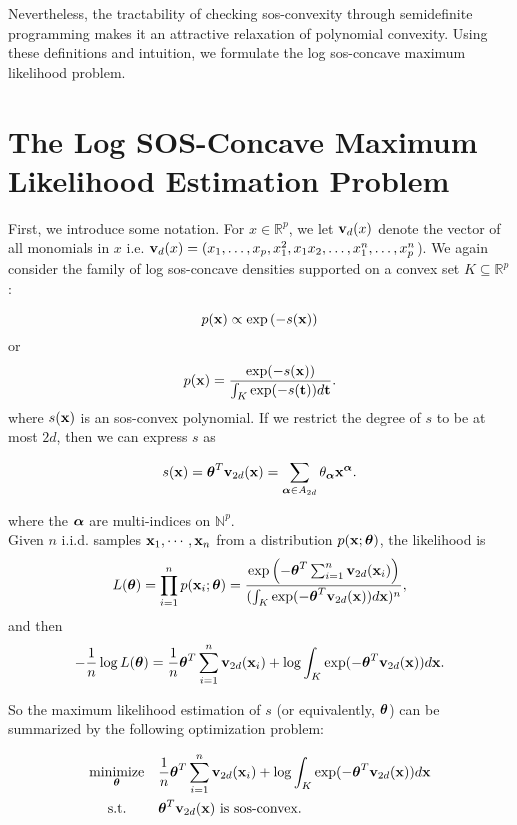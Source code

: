 \documentclass[11pt,reqno]{amsart}
\numberwithin{equation}{section}
\newcommand{\mr}{\mathbb{R}}
\newcommand{\optprob}[5]
{
	\begin{equation}\label{#5}
	\begin{aligned}
	& \underset{#2}{\text{#1}}
	& & #3 \\
	& \text{\quad\ s.t.}
	& & #4
	\end{aligned}
	\end{equation}
}
\begin{document}
Nevertheless, the tractability of checking sos-convexity through semidefinite programming makes it an attractive relaxation of polynomial convexity. Using these definitions and intuition, we formulate the log sos-concave maximum likelihood problem.

\section{The Log SOS-Concave Maximum Likelihood Estimation Problem}

First, we introduce some notation. For $x \in \mr^p$, we let ${\bf v}_d(x)$ denote the vector of all monomials in $x$ i.e. ${\bf v}_d(x) = (x_1, \hdots, x_p, x_1^2, x_1 x_2, \hdots, x_1^n, \hdots, x_p^n$). We again consider the family of log sos-concave densities supported on a convex set $K \subseteq \mathbb R^p$:

\begin{equation} \notag
p({\bf x}) \propto \exp \left(-s({\bf x})\right)
\end{equation}
or
\begin{equation} \notag
p({\bf x}) = \frac{\exp (-s({\bf x}))}{\int_K \exp (-s({\bf t})) d{\bf t}}.
\end{equation}
where $s({\bf x})$ is an sos-convex polynomial. If we restrict the degree of $s$ to be at most $2d$, then we can express $s$ as 

\[
s({\bf x}) = {\boldsymbol\theta}^T{\bf v}_{2d}({\bf x}) = \sum_{{\boldsymbol\alpha} \in A_{2d}} \theta_{\boldsymbol\alpha} {\bf x}^{\boldsymbol\alpha}.
\]

where the ${\boldsymbol\alpha}$ are multi-indices on $\mathbb{N}^p$. \\

Given $n$ i.i.d. samples ${\bf x}_1, \cdots, {\bf x}_n$ from a distribution $p({\bf x}; {\boldsymbol\theta})$, the likelihood is
\begin{equation} \notag
L({\boldsymbol\theta}) = \prod_{i = 1} ^n p({\bf x}_i; {\boldsymbol\theta}) = \frac{\exp \left( -{\boldsymbol\theta}^T \sum_{i = 1}^n {\bf v}_{2d}({\bf x}_i)   \right)}{(\int_K \exp (-{\boldsymbol\theta}^T{\bf v}_{2d}({\bf x})) d{\bf x})^n},
\end{equation}
and then
$$- \frac{1}{n} \log L({\boldsymbol\theta}) = \frac{1}{n} {\boldsymbol\theta}^T \sum_{i = 1}^n {\bf v}_{2d}({\bf x}_i) + \log \int_K \exp (-{\boldsymbol\theta}^T{\bf v}_{2d}({\bf x})) d{\bf x}.$$

So the maximum likelihood estimation of $s$ (or equivalently, ${\boldsymbol\theta}$) can be summarized by the following optimization problem:
\optprob{minimize}{\bftheta}{\frac{1}{n} \bftheta^T \sum_{i = 1}^n \bfv_{2d}(\bfx_i) + \log \int_K \exp (-\bftheta^T\bfv_{2d}(\bfx)) d{\bf x} }
{\text{$\bftheta^T \bfv_{2d}(\bfx)$ is sos-convex.}}{maxlike-reg}
\end{document}
